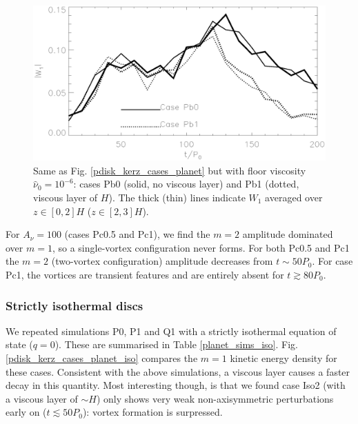 \begin{figure}
  \centering
  \includegraphics[width=\linewidth]{figures/pdisk_kerz_cases_nu6}
  \caption{Same as Fig. \ref{pdisk_kerz_cases_planet} but with
    floor viscosity $\hat{\nu}_0=10^{-6}$: cases Pb0 (solid, no viscous layer) and Pb1
    (dotted, viscous layer of $H$). The thick (thin) lines indicate
    $W_1$ averaged over $z\in[0,2]H$
    ($z\in[2,3]H$). 
    \label{pdisk_kerz_cases_planet_hivisc}}
\end{figure}


For $A_\nu=100$ (cases Pc0.5 and Pc1), we find the $m=2$ amplitude
dominated over $m=1$, so a single-vortex configuration never
forms. For both Pc0.5 and Pc1 the $m=2$ (two-vortex configuration)
amplitude decreases from $t\sim 50P_0$. For case Pc1, the vortices are
transient features and are entirely absent for $t\gtrsim80P_0$.  


\subsubsection{Strictly isothermal discs} 
We repeated simulations P0, P1 and Q1 with a strictly isothermal
equation of state ($q=0$). These are summarised in Table
\ref{planet_sims_iso}. Fig. \ref{pdisk_kerz_cases_planet_iso} compares
the $m=1$ kinetic energy density for these cases. Consistent with the
above simulations, a viscous layer causes a faster decay in this
quantity. Most interesting though, is that we found case Iso2 (with a viscous
layer of $\sim H$) only shows very weak non-axisymmetric perturbations
early on ($t\lesssim 50P_0$): vortex formation is surpressed. 



